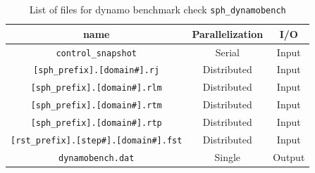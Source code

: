 \begin{table}[htp]
\caption{List of files for dynamo benchmark check {\tt sph\_dynamobench} }
\begin{center} 
\begin{tabular}{|c|c|c|}
\hline
 name & Parallelization & I/O \\ \hline \hline
\verb|control_snapshot| & Serial & Input \\ \hline
\verb|[sph_prefix].[domain#].rj|  & Distributed & Input \\
\verb|[sph_prefix].[domain#].rlm| & Distributed & Input \\
\verb|[sph_prefix].[domain#].rtm| & Distributed & Input \\
\verb|[sph_prefix].[domain#].rtp| & Distributed & Input \\ \hline
\verb|[rst_prefix].[step#].[domain#].fst| &  Distributed & Input  \\ \hline
\verb|dynamobench.dat| & Single & Output \\ \hline
\end{tabular}
\end{center}
\label{table:sph_dynamobench}
\end{table}

